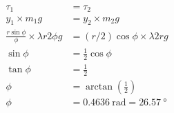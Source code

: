 \documentclass[12pt]{article}
\begin{document}
\begin{align*}
\tau_1 &= \tau_2 \\
y_1 \times m_1g &= y_2 \times m_2g \\
\frac{ r \sin \phi }{ \phi } \times \lambda r2 \phi g &= (r/2) \cos \phi \times \lambda 2r g \\
\sin \phi &= \frac{1}{2} \cos \phi \\
\tan \phi &= \frac{1}{2}\\
\phi &= \arctan{\left(\frac{1}{2}\right)} \\
\phi &= \SI{0.4636}{\radian} = \SI{26.57}{\degree}
\end{align*}
\end{document}
